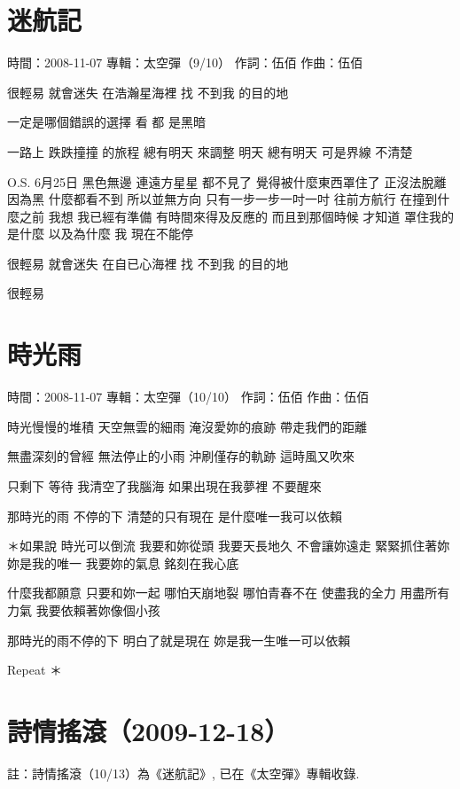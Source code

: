 \documentclass[UTF8,a4paper,oneside,twocolumn,12pt]{ctexbook}
\newcommand{\infopair}[2]{\textbullet #1：#2}
\newcommand{\zc}[1][伍佰]{\infopair{作詞}{#1}}
\newcommand{\zq}[1][伍佰]{\infopair{作曲}{#1}}
\newcommand{\zj}[1]{\infopair{專輯}{#1}}
\newcommand{\sj}[1]{\infopair{時間}{#1}}
\newenvironment{info}{\begin{flushleft}\kaishu
	}
	{\end{flushleft}\normalsize\yahei\par}
\newenvironment{lyric}{
	}
{}
\begin{document}
\section{迷航記}
\begin{info}
	\sj{2008-11-07}
	\zj{太空彈（9/10）}
	\zc
	\zq
\end{info}
\begin{lyric}
	很輕易 就會迷失 在浩瀚星海裡
	找 不到我 的目的地

	一定是哪個錯誤的選擇
	看 都 是黑暗

	一路上 跌跌撞撞 的旅程
	總有明天 來調整
	明天 總有明天
	可是界線 不清楚

	O.S.
	6月25日 黑色無邊 連遠方星星
	都不見了 覺得被什麼東西罩住了
	正沒法脫離 因為黑 什麼都看不到
	所以並無方向 只有一步一步一吋一吋
	往前方航行 在撞到什麼之前
	我想 我已經有準備 有時間來得及反應的
	而且到那個時候 才知道 罩住我的是什麼
	以及為什麼 我 現在不能停

	很輕易 就會迷失 在自已心海裡
	找 不到我 的目的地

	很輕易
\end{lyric}

\section{時光雨}
\begin{info}
	\sj{2008-11-07}
	\zj{太空彈（10/10）}
	\zc
	\zq
\end{info}
\begin{lyric}
	時光慢慢的堆積
	天空無雲的細雨
	淹沒愛妳的痕跡
	帶走我們的距離

	無盡深刻的曾經
	無法停止的小雨
	沖刷僅存的軌跡
	這時風又吹來

	只剩下 等待
	我清空了我腦海
	如果出現在我夢裡
	不要醒來

	那時光的雨 不停的下
	清楚的只有現在
	是什麼唯一我可以依賴

	＊如果說
	時光可以倒流
	我要和妳從頭
	我要天長地久
	不會讓妳遠走
	緊緊抓住著妳
	妳是我的唯一
	我要妳的氣息
	銘刻在我心底

	什麼我都願意
	只要和妳一起
	哪怕天崩地裂
	哪怕青春不在
	使盡我的全力
	用盡所有力氣
	我要依賴著妳像個小孩

	那時光的雨不停的下
	明白了就是現在
	妳是我一生唯一可以依賴

	Repeat ＊
\end{lyric}

\section*{詩情搖滾（2009-12-18）}
註：詩情搖滾（10/13）為《迷航記》, 已在《太空彈》專輯收錄.
\end{document}

